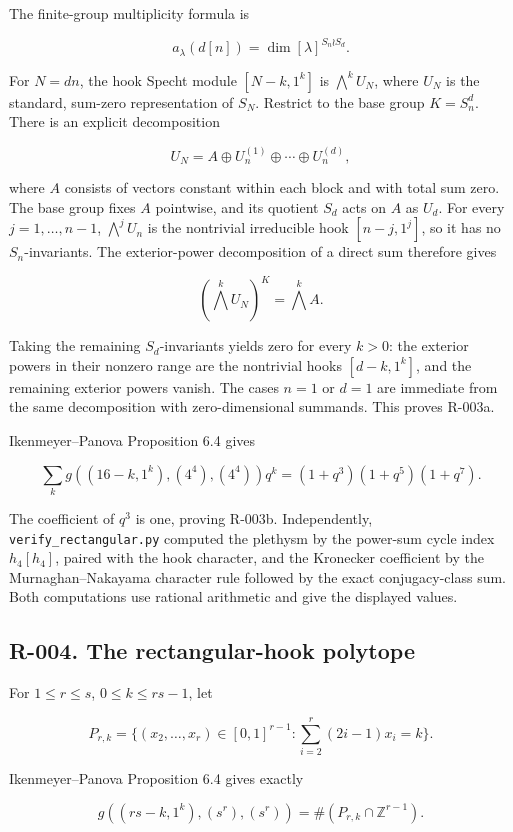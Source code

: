 \documentclass[
  10pt,
]{article}
\begin{document}
The finite-group multiplicity formula is

\[
a_\lambda(d[n])=\dim[\lambda]^{S_n\wr S_d}.
\]

For \(N=dn\), the hook Specht module \([N-k,1^k]\) is
\(\bigwedge^kU_N\), where \(U_N\) is the standard, sum-zero
representation of \(S_N\). Restrict to the base group \(K=S_n^d\). There
is an explicit decomposition

\[
U_N=A\oplus U_n^{(1)}\oplus\cdots\oplus U_n^{(d)},
\]

where \(A\) consists of vectors constant within each block and with
total sum zero. The base group fixes \(A\) pointwise, and its quotient
\(S_d\) acts on \(A\) as \(U_d\). For every \(j=1,\ldots,n-1\),
\(\bigwedge^jU_n\) is the nontrivial irreducible hook \([n-j,1^j]\), so
it has no \(S_n\)-invariants. The exterior-power decomposition of a
direct sum therefore gives

\[
(\bigwedge^kU_N)^K=\bigwedge^kA.
\]

Taking the remaining \(S_d\)-invariants yields zero for every \(k>0\):
the exterior powers in their nonzero range are the nontrivial hooks
\([d-k,1^k]\), and the remaining exterior powers vanish. The cases
\(n=1\) or \(d=1\) are immediate from the same decomposition with
zero-dimensional summands. This proves R-003a.

Ikenmeyer--Panova Proposition 6.4 gives

\[
\sum_k g((16-k,1^k),(4^4),(4^4))q^k
=(1+q^3)(1+q^5)(1+q^7).
\]

The coefficient of \(q^3\) is one, proving R-003b. Independently,
\texttt{\small verify\_\allowbreak{}rectangular.py} computed the
plethysm by the power-sum cycle index \(h_4[h_4]\), paired with the hook
character, and the Kronecker coefficient by the Murnaghan--Nakayama
character rule followed by the exact conjugacy-class sum. Both
computations use rational arithmetic and give the displayed values.

\subsection{R-004. The rectangular-hook
polytope}\label{r-004.-the-rectangular-hook-polytope}

For \(1\le r\le s\), \(0\le k\le rs-1\), let

\[
P_{r,k}=\{(x_2,\ldots,x_r)\in[0,1]^{r-1}:
\sum_{i=2}^r(2i-1)x_i=k\}.
\]

Ikenmeyer--Panova Proposition 6.4 gives exactly

\[
g((rs-k,1^k),(s^r),(s^r))=\#(P_{r,k}\cap\mathbb Z^{r-1}).
\tag{R-004}
\]
\end{document}
